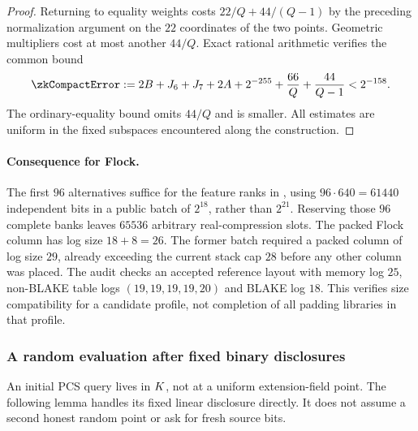 \begin{proof}
Returning to equality weights costs $22/Q+44/(Q-1)$ by the preceding normalization argument on the $22$ coordinates of the two points. Geometric multipliers cost at most another $44/Q$. Exact rational arithmetic verifies the common bound
\[
 \zkCompactError:={}
 2B+J_6+J_7+2A+2^{-255}
 +\frac{66}{Q}+\frac{44}{Q-1}<2^{-158}.
\]
The ordinary-equality bound omits $44/Q$ and is smaller. All estimates are uniform in the fixed subspaces encountered along the construction.
\end{proof}

\paragraph{Consequence for Flock.} The first $96$ alternatives suffice for the feature ranks in , using $96\cdot640=61440$ independent bits in a public batch of $2^{18}$, rather than $2^{21}$. Reserving those $96$ complete banks leaves $65536$ arbitrary real-compression slots. The packed Flock column has log size $18+8=26$. The former batch required a packed column of log size $29$, already exceeding the current stack cap $28$ before any other column was placed. The audit checks an accepted reference layout with memory log $25$, non-BLAKE table logs $(19,19,19,19,20)$ and BLAKE log $18$. This verifies size compatibility for a candidate profile, not completion of all padding libraries in that profile.

\subsubsection{A random evaluation after fixed binary disclosures}

An initial PCS query lives in $K$, not at a uniform extension-field point. The following lemma handles its fixed linear disclosure directly. It does not assume a second honest random point or ask for fresh source bits.

